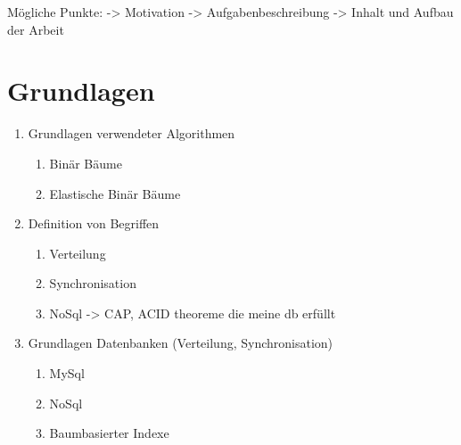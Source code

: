 \documentclass[a4paper,11pt,oneside,%
headsepline,												%
footsepline,												%
bibtotocnumbered									%
]{scrreprt}
\begin{document}
	Mögliche Punkte:
	-> Motivation
	-> Aufgabenbeschreibung
	-> Inhalt und Aufbau der Arbeit	
		
\chapter{Grundlagen}

	\begin{enumerate}[1.]
			\item Grundlagen verwendeter Algorithmen
				\begin{enumerate}[1.]
					\item Binär Bäume
					\item Elastische Binär Bäume
				\end{enumerate}
			\item Definition von Begriffen
				\begin{enumerate}[1.]
					\item Verteilung
					\item Synchronisation
					\item NoSql -> CAP, ACID theoreme die meine db erfüllt 
				\end{enumerate}
			\item Grundlagen Datenbanken (Verteilung, Synchronisation)
				\begin{enumerate}[1.]
					\item MySql
					\item NoSql 
					\item Baumbasierter Indexe
				\end{enumerate}
	\end{enumerate}
\end{document}
